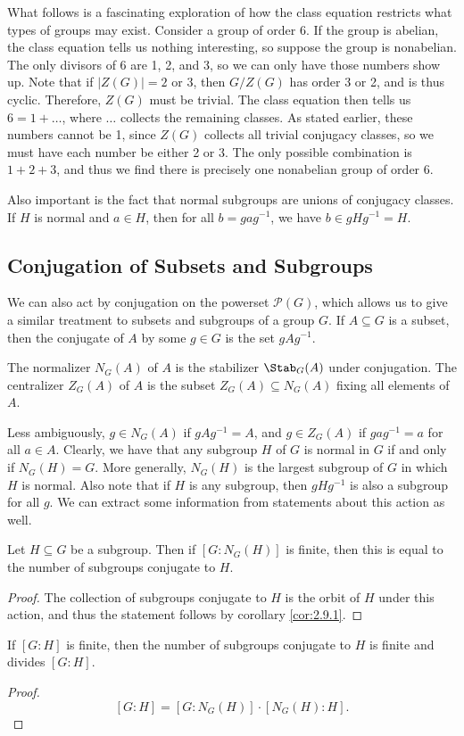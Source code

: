 What follows is a fascinating exploration of how the class equation restricts what types of groups may exist. Consider a group of order 6. If the group is abelian, the class equation tells us nothing interesting, so suppose the group is nonabelian. The only divisors of 6 are 1, 2, and 3, so we can only have those numbers show up. Note that if $\left| Z(G) \right| =2$ or 3, then $G/Z(G)$ has order 3 or 2, and is thus cyclic. Therefore, $Z(G)$ must be trivial. The class equation then tells us $6=1+\ldots $, where $\ldots $ collects the remaining classes. As stated earlier, these numbers cannot be 1, since $Z(G)$ collects all trivial conjugacy classes, so we must have each number be either 2 or 3. The only possible combination is $1+2+3$, and thus we find there is precisely one nonabelian group of order $6$.

Also important is the fact that normal subgroups are unions of conjugacy classes. If $H$ is normal and $a\in H$, then for all $b=gag^{-1} $, we have $b\in gHg^{-1} =H$.

\subsection{Conjugation of Subsets and Subgroups}
We can also act by conjugation on the powerset $\mathscr{P} (G)$, which allows us to give a similar treatment to subsets and subgroups of a group $G$. If $A\subseteq G$ is a subset, then the conjugate of $A$ by some $g\in G$ is the set $gAg^{-1} $.
\begin{definition}\label{dfn:4.1.5}
	The normalizer $N_G(A)$ of $A$ is the stabilizer $\Stab_{G}(A) $ under conjugation. The centralizer $Z_G(A)$ of $A$ is the subset $Z_G(A)\subseteq N_G(A)$ fixing all elements of $A$.
\end{definition}
Less ambiguously, $g\in N_G(A)$ if $gAg^{-1} =A$, and $g\in Z_G(A)$ if $gag^{-1} =a$ for all $a\in A$. Clearly, we have that any subgroup $H$ of $G$ is normal in $G$ if and only if $N_G(H)=G$. More generally, $N_G(H)$ is the largest subgroup of $G$ in which $H$ is normal. Also note that if $H$ is any subgroup, then $gHg^{-1} $ is also a subgroup for all $g$. We can extract some information from statements about this action as well.
\begin{lemma}\label{lma:4.1.2}
	Let $H\subseteq G$ be a subgroup. Then if $\left[ G : N_G(H) \right] $ is finite, then this is equal to the number of subgroups conjugate to $H$.
\end{lemma}
\begin{proof}
	The collection of subgroups conjugate to $H$ is the orbit of $H$ under this action, and thus the statement follows by corollary \ref{cor:2.9.1}.
\end{proof}
\begin{corollary}\label{cor:4.1.3}
	If $[G:H]$ is finite, then the number of subgroups conjugate to $H$ is finite and divides $[G:H]$.
\end{corollary}
\begin{proof}
	\[
		\left[ G:H \right] =\left[ G : N_G(H) \right] \cdot \left[ N_G(H) : H \right] 
	.\]
\end{proof}

